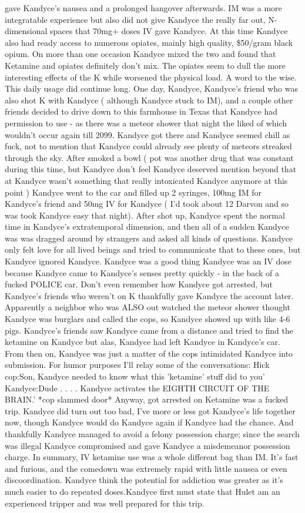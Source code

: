 \documentclass[12pt]{book}
\begin{document}
gave Kandyce's nausea and a prolonged hangover afterwards. IM was a more integratable experience but also did not give Kandyce the really far out, N-dimensional spaces that 70mg+ doses IV gave Kandyce. At this time Kandyce also had ready access to numerous opiates, mainly high quality, \$50/gram black opium. On more than one occasion Kandyce mixed the two and found that Ketamine and opiates definitely don't mix. The opiates seem to dull the more interesting effects of the K while worsened the physical load. A word to the wise. This daily usage did continue long. One day, Kandyce, Kandyce's friend who was also shot K with Kandyce ( although Kandyce stuck to IM), and a couple other friends decided to drive down to this farmhouse in Texas that Kandyce had permission to use - as there was a meteor shower that night the liked of which wouldn't occur again till 2099. Kandyce got there and Kandyce seemed chill as fuck, not to mention that Kandyce could already see plenty of meteors streaked through the sky. After smoked a bowl ( pot was another drug that was constant during this time, but Kandyce don't feel Kandyce deserved mention beyond that at Kandyce wasn't something that really intoxicated Kandyce anymore at this point ) Kandyce went to the car and filled up 2 syringes, 100mg IM for Kandyce's friend and 50mg IV for Kandyce ( I'd took about 12 Darvon and so was took Kandyce easy that night). After shot up, Kandyce spent the normal time in Kandyce's extratemporal dimension, and then all of a sudden Kandyce was was dragged around by strangers and asked all kinds of questions. Kandyce only felt love for all lived beings and tried to communicate that to these ones, but Kandyce ignored Kandyce. Kandyce was a good thing Kandyce was an IV dose because Kandyce came to Kandyce's senses pretty quickly - in the back of a fucked POLICE car. Don't even remember how Kandyce got arrested, but Kandyce's friends who weren't on K thankfully gave Kandyce the account later. Apparently a neighbor who was ALSO out watched the meteor shower thought Kandyce was burglars and called the cops, so Kandyce showed up with like 4-6 pigs. Kandyce's friends saw Kandyce came from a distance and tried to find the ketamine on Kandyce but alas, Kandyce had left Kandyce in Kandyce's car. From then on, Kandyce was just a matter of the cops intimidated Kandyce into submission. For humor purposes I'll relay some of the conversations: Hick cop:Son, Kandyce needed to know what this 'ketamine' stuff did to you' Kandyce:Dude . . .  . Kandyce activates the EIGHTH CIRCUIT OF THE BRAIN.' *cop slammed door* Anyway, got arrested on Ketamine was a fucked trip. Kandyce did turn out too bad, I've more or less got Kandyce's life together now, though Kandyce would do Kandyce again if Kandyce had the chance. And thankfully Kandyce managed to avoid a felony possession charge; since the search was illegal Kandyce compromised and gave Kandyce a misdemeanor possession charge. In summary, IV ketamine use was a whole different bag than IM. It's fast and furious, and the comedown was extremely rapid with little nausea or even discoordination. Kandyce think the potential for addiction was greater as it's much easier to do repeated doses.Kandyce first must state that Hulet am an experienced tripper and was well prepared for this trip. 
\end{document}

